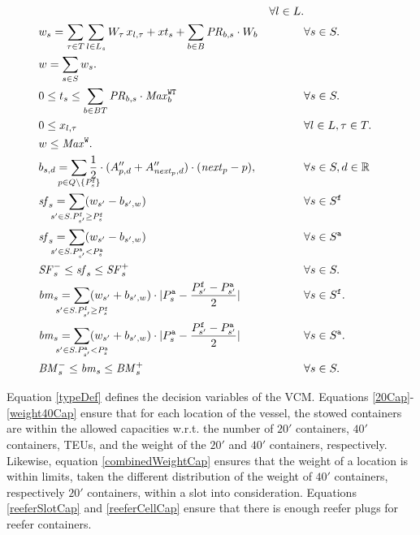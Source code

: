 \begin{align}
			&& \forall l \in L.\\
	\label{totalWeightDef}
	&w_s = \sum_{\tau \in T} \sum_{l\in L_s} W_\tau\, x_{l,\tau} + xt_s + \sum_{b\in B} \mi{PR}_{b,s}\cdot W_b 
			&& \forall s \in S.\\
	\label{totalDisp}
	&w  = \sum_{s\in S} w_s. 
			&&\\
	\label{btLim}
	&0 \leq t_s \leq \sum_{b \in BT} \mi{PR}_{b,s}\cdot \mi{Max}^\trt{WT}_b 
			&& \forall s\in S.\\
	\label{xPos}
	&0 \leq x_{l,\tau} 
			&& \forall l\in L, \tau\in T.\\
	\label{wTotalLim}
	&w \leq \mi{Max}^\trt{W}. 
			&&\\
	\label{defBancy}
	&b_{s,d} = \smashoperator[lr]{\sum_{p \in Q\setminus \{P^\trt{f}_s\}}} \frac{1}{2}\cdot(A''_{p,d}+A''_{\mi{next}_p,d})\cdot (\mi{next}_p-p), 
			&& \forall s\in S, d\in \mathbb{R}\\%
	\label{sfF}
	&\mi{sf}_s = \smashoperator[lr]{\sum_{s' \in S. P^\texttt{f}_{s'} \geq P^\texttt{f}_s}} (w_{s'} - b_{s',w}) 
			&& \forall s \in S^\texttt{f}\\
	\label{sfA}
	&\mi{sf}_s = \smashoperator[lr]{\sum_{s' \in S. P^\texttt{a}_{s'} < P^\texttt{a}_s}} (w_{s'} - b_{s',w}) 
			&& \forall s \in S^\texttt{a}\\
	\label{sfLim}
	&\mi{SF}^-_s \leq \mi{sf}_s \leq \mi{SF}^+_s
			&& \forall s \in S.\\
	\label{bmF}
	&\mi{bm}_s = 	\smashoperator[lr]{\sum_{s' \in S. P^\texttt{f}_{s'} \geq P^\texttt{f}_s}} (w_{s'} + b_{s',w})\cdot |P^\trt{a}_s - \frac{P^\trt{f}_{s'}-P^\trt{a}_{s'}}{2}|
			&& \forall s \in S^\texttt{f}.\\
	\label{bmA}
	&\mi{bm}_s = \smashoperator[lr]{\sum_{s' \in S. P^\texttt{a}_{s'} < P^\texttt{a}_s}} (w_{s'} + b_{s',w})\cdot |P^\trt{a}_s - \frac{P^\trt{f}_{s'}-P^\trt{a}_{s'}}{2}|
			&& \forall s \in S^\texttt{a}.\\
	\label{bmLim}
	&\mi{BM}^-_s \leq \mi{bm}_s \leq \mi{BM}^+_s 
			&& \forall s \in S. 
\end{align}

Equation \eqref{typeDef} defines the decision variables of the VCM. Equations \eqref{20Cap}-\eqref{weight40Cap} ensure that for each location of the vessel, the stowed containers are within the allowed capacities w.r.t. the number of $20'$ containers, $40'$ containers, TEUs, and the weight of the $20'$ and $40'$ containers, respectively.
Likewise, equation \eqref{combinedWeightCap} ensures that the weight of a location is within limits, taken the different distribution of the weight of $40'$ containers, respectively $20'$ containers, within a slot into consideration. Equations \eqref{reeferSlotCap} and \eqref{reeferCellCap} ensure that there is enough reefer plugs for reefer containers. 

